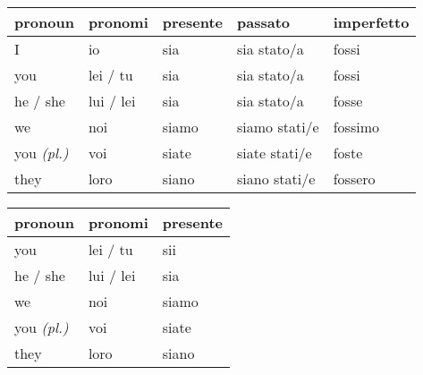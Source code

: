 \documentclass{article} %
\begin{document}
\begin{center}
        \begin{tabular}{lllll}
            \textbf{pronoun} & \textbf{pronomi} & \textbf{presente} & \textbf{passato} & \textbf{imperfetto}\\
            \hline
            I                   & io        & sia       & sia stato/a   & fossi \\
            you                 & lei / tu  & sia       & sia stato/a   & fossi \\
            he / she            & lui / lei & sia       & sia stato/a   & fosse \\
            we                  & noi       & siamo     & siamo stati/e & fossimo \\ 
            you \textit{(pl.)}  & voi       & siate     & siate stati/e & foste \\
            they                & loro      & siano     & siano stati/e & fossero \\
        \end{tabular}

        \begin{tabular}{lll}
            \textbf{pronoun} & \textbf{pronomi} & \textbf{presente} \\
            \hline
            you                 & lei / tu  & sii \\
            he / she            & lui / lei & sia \\
            we                  & noi       & siamo \\ 
            you \textit{(pl.)}  & voi       & siate \\
            they                & loro      & siano \\
        \end{tabular}

    \end{center}
\end{document}
